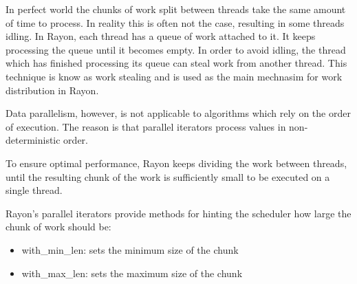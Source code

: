 
In perfect world the chunks of work split between threads take the same amount of time to process. In reality this is often not the case, resulting in some threads idling. In Rayon, each thread has a queue of work attached to it. It keeps processing the queue until it becomes empty. In order to avoid idling, the thread which has finished processing its queue can steal work from another thread. This technique is know as work stealing and is used as the main mechnasim for work distribution in Rayon. 





Data parallelism, however, is not applicable to algorithms which rely on the order of execution. The reason is that parallel iterators process values in non-deterministic order. 

To ensure optimal performance, Rayon keeps dividing the work between threads, until the resulting chunk of the work is sufficiently small to be executed on a single thread. 

Rayon's parallel iterators provide methods for hinting the scheduler how large the chunk of work should be: 
\begin{itemize}
    \item with\_min\_len: sets the minimum size of the chunk
    \item with\_max\_len: sets the maximum size of the chunk
\end{itemize}


